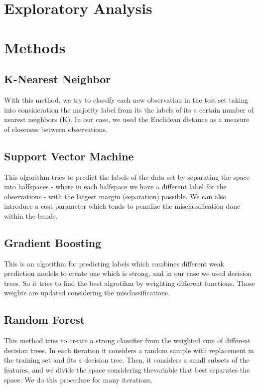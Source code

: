 \documentclass[paper=a4, fontsize=11pt]{scrartcl}
\numberwithin{equation}{section}
\numberwithin{figure}{section}
\numberwithin{table}{section}
\begin{document}

\section{Exploratory Analysis}





\section{Methods}
\subsection{K-Nearest Neighbor}
With this method, we try to classify each new observation in the test set taking into consideration the majority label from its the labels of its a certain number of nearest neighbors (K). In our case, we used the Euclidean distance as a measure of closeness between observations.


\subsection{Support Vector Machine}
This algorithm tries to predict the labels of the data set by separating the space into halfspaces - where in each halfspace we have a different label for the observations - with the largest margin (separation) possible. We can also introduce a cost parameter which tends to penalize the misclassification done within the bands. 

\subsection{Gradient Boosting}
This is an algorithm for predicting labels which combines different weak prediction models to create one which is strong, and in our case we used decision trees. So it tries to find the best algrotihm by weighting different functions. Those weights are updated considering the misclassifications. 

\subsection{Random Forest}
This method tries to create a strong classifier from the weighted sum of different decision trees. In each iteration it considers a random sample with replacement in the training set and fits a decision tree. Then, it considers a small subsets of the features, and we divide the space considering thevariable that best separates the space. We do this procedure for many iterations. 
\end{document}
